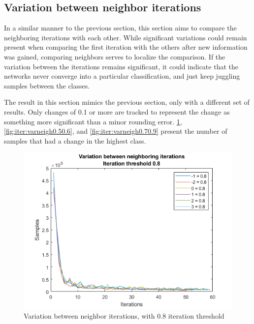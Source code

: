 \subsection{Variation between neighbor iterations}
In a similar manner to the previous section, this section aims to compare the neighboring iterations with each other.
While significant variations could remain present when comparing the first iteration with the others after new information was gained, comparing neighbors serves to localize the comparison.
If the variation between the iterations remains significant, it could indicate that the networks never converge into a particular classification, and just keep juggling samples between the classes.

The result in this section mimics the previous section, only with a different set of results.
Only changes of 0.1 or more are tracked to represent the change as something more significant than a minor rounding error. 
\cref{fig:iter:varneigh0.8}, \cref{fig:iter:varneigh0.50.6}, and \cref{fig:iter:varneigh0.70.9} present the number of samples that had a change in the highest class.

\begin{figure}  %
  \centering
  \includegraphics[width=.7\textwidth]{figures/varneigh-0.8.png}
  \caption{Variation between neighbor iterations, with 0.8 iteration threshold}
  \label{fig:iter:varneigh0.8}
\end{figure}

